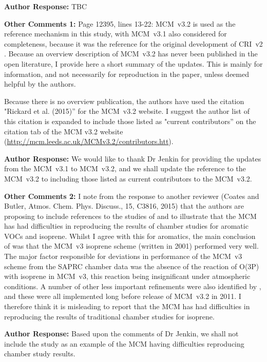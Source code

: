 \documentclass{article}
\begin{document}
\textbf{Author Response:} TBC

\textbf{Other Comments 1:} Page 12395, lines 13-22: MCM~v3.2 is used as the reference mechanism in this study, with MCM~v3.1 also considered for completeness, because it was the reference for the original development of CRI~v2 \citep{Jenkin:2008}. Because an overview description of MCM~v3.2 has never been published in the open literature, I provide here a short summary of the updates. This is mainly for information, and not necessarily for reproduction in the paper, unless deemed helpful by the authors.

Because there is no overview publication, the authors have used the citation "Rickard et al. (2015)'' for the MCM~v3.2 website. I suggest the author list of this citation is expanded to include those listed as "current contributors'' on the citation tab of the MCM v3.2 website (\url{http://mcm.leeds.ac.uk/MCMv3.2/contributors.htt}).

\textbf{Author Response:} We would like to thank Dr Jenkin for providing the updates from the MCM~v3.1 to MCM~v3.2, and we shall update the reference to the MCM~v3.2 to \citep{MCM_Site} including those listed as current contributors to the MCM~v3.2.

\textbf{Other Comments 2:} I note from the response to another reviewer (Coates and Butler, Atmos. Chem.  Phys. Discuss., 15, C3816, 2015) that the authors are proposing to include references to the studies of \citet{Bloss:2005} and \citet{Pinho:2005} to illustrate that the MCM has had difficulties in reproducing the results of chamber studies for aromatic VOCs and isoprene. Whilst I agree with this for aromatics, the main conclusion of \citet{Pinho:2005} was that the MCM~v3 isoprene scheme (written in 2001) performed very well. The major factor responsible for deviations in performance of the MCM~v3 scheme from the SAPRC chamber data was the absence of the reaction of O(3P) with isoprene in MCM~v3, this reaction being insignificant under atmospheric conditions. A number of other less important refinements were also identified by \citet{Pinho:2005}, and these were all implemented long before release of MCM~v3.2 in 2011. I therefore think it is misleading to report that the MCM has had difficulties in reproducing the results of traditional chamber studies for isoprene. 

\textbf{Author Response:} Based upon the comments of Dr Jenkin, we shall not include the \citet{Pinho:2005} study as an example of the MCM having difficulties reproducing chamber study results.
\end{document}
